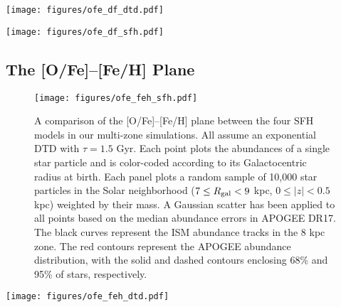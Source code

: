 \documentclass[twocolumn,linenumbers,twocolappendix]{aastex631}
\begin{document}
\begin{figure*}
    \centering
    \texttt{[image: figures/ofe\_df\_dtd.pdf]}
    \caption{Distributions of [O/Fe] for multi-zone simulations with different DTDs. In all cases an inside-out SFH is assumed. The plot format is similar to Figure \ref{fig:feh-df-sfh}. All distributions are smoothed with a box-car width of 0.05 dex.}
    \label{fig:ofe-df-dtd}
\end{figure*}

\begin{figure*}
    \centering
    \texttt{[image: figures/ofe\_df\_sfh.pdf]}
    \caption{Distributions of [O/Fe] for multi-zone simulations with different SFHs. The plot format is similar to Figure \ref{fig:feh-df-sfh}. In all cases an exponential DTD with timescale $\tau=1.5$ Gyr is assumed.}
    \label{fig:ofe-df-sfh}
\end{figure*}

\subsection{The [O/Fe]--[Fe/H] Plane}
\label{sec:ofe-feh}

\begin{figure}
    \centering
    \texttt{[image: figures/ofe\_feh\_sfh.pdf]}
    \caption{A comparison of the [O/Fe]--[Fe/H] plane between the four SFH models in our multi-zone simulations. All assume an exponential DTD with $\tau=1.5$ Gyr. Each point plots the abundances of a single star particle and is color-coded according to its Galactocentric radius at birth. Each panel plots a random sample of 10,000 star particles in the Solar neighborhood ($7\leq R_{\rm gal}<9$ kpc, $0\leq|z|<0.5$ kpc) weighted by their mass. A Gaussian scatter has been applied to all points based on the median abundance errors in APOGEE DR17. The black curves represent the ISM abundance tracks in the 8 kpc zone. The red contours represent the APOGEE abundance distribution, with the solid and dashed contours enclosing 68\% and 95\% of stars, respectively.}
    \label{fig:ofe-feh-sfh}
\end{figure}

\begin{figure*}
    \centering
    \texttt{[image: figures/ofe\_feh\_dtd.pdf]}
    \caption{Similar to Figure \ref{fig:ofe-feh-sfh} but comparing multi-zone simulations with different DTD models. All assume an inside-out SFH.}
    \label{fig:ofe-feh-dtd}
\end{figure*}
\end{document}
